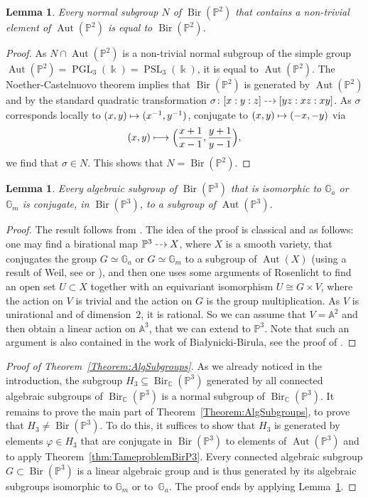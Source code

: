 \documentclass[JEP,XML,SOM,Unicode,NoFloatCountersInSection]{cedram}
\newcommand\mto{\mathchoice{\longmapsto}{\mapsto}{\mapsto}{\mapsto}}
\newcommand{\dradpl}{{\hspace*{-2mm}\begin{tikzcd}[ampersand replacement=\&,column sep = scriptsize]\mbox{}\ar[r,dashed]\&\mbox{}\end{tikzcd}\hspace*{-2mm}}}
\newcommand{\dratst}{{\hspace*{-2mm}\begin{tikzcd}[ampersand replacement=\&,column sep = small]\mbox{}\ar[r,dashed]\&\mbox{}\end{tikzcd}\hspace*{-2mm}}}
\let\drascst\dratst
\newcommand{\dra}{\mathchoice{\dradpl}{\dratst}{\drascst}{\drascst}}
\DeclareMathOperator{\Bir}{Bir}
\DeclareMathOperator{\Aut}{Aut}
\DeclareMathOperator{\PGL}{PGL}
\DeclareMathOperator{\PSL}{PSL}
\theoremstyle{plain}
\newtheorem{lem}[thm]{Lemma}
\theoremstyle{definition}
\newcommand{\CC}{\mathbb C}
\newcommand{\kk}{\Bbbk}
\newcommand{\PP}{\mathbb P}
\begin{document}
\begin{lem}\label{Lem:NormalSubAutP2}
Every normal subgroup $N$ of $\Bir(\PP^2)$ that contains a non-trivial element of $\Aut(\PP^2)$ is equal to $\Bir(\PP^2)$.
\end{lem}

\begin{proof}
As $N\cap \Aut(\PP^2)$ is a non-trivial normal subgroup of the simple group $\Aut(\PP^2)=\PGL_3(\kk)=\PSL_3(\kk)$, it is equal to $\Aut(\PP^2)$.
The Noether-Castelnuovo theorem \cite{Cas} implies that $\Bir(\PP^2)$ is generated by $\Aut(\PP^2)$ and by the standard quadratic transformation $\sigma\colon [x:y:z]\dra [yz:xz:xy]$. As $\sigma$ corresponds locally to $(x,y)\mto (x^{-1},y^{-1})$, conjugate to $(x,y)\mto (-x,-y)$ via
\[
(x,y)\mto \Bigl(\frac{x+1}{x-1},\frac{y+1}{y-1}\Bigr),
\] we find that $\sigma\in N$. This shows that $N=\Bir(\PP^2)$.
\end{proof}
\begin{lem}\label{Lem:GaGmAutP3}
Every algebraic subgroup of $\Bir(\PP^3)$ that is isomorphic to $\mathbb{G}_a$ or $\mathbb{G}_m$ is conjugate, in $\Bir(\PP^3)$, to a subgroup of $\Aut(\PP^3)$.
\end{lem}
\begin{proof}The result follows from \cite[2.5.8]{BFT}.
The idea of the proof is classical and as follows: one may find a birational map $\PP^3\dra X$, where $X$ is a smooth variety, that conjugates the group $G\simeq \mathbb{G}_a$ or $G\simeq \mathbb{G}_m$ to a subgroup of $\Aut(X)$ (using a result of Weil, see \cite{Weil} or \cite{Kraft}), and then one uses some arguments of Rosenlicht to find an open set $U\subset X$ together with an equivariant isomorphism $U\cong G\times V$, where the action on $V$ is trivial and the action on $G$ is the group multiplication. As $V$ is unirational and of dimension~$2$, it is rational. So we can assume that $V=\mathbb{A}^2$ and then obtain a linear action on $\mathbb{A}^3$, that we can extend to $\PP^3$. Note that such an argument is also contained in the work of Bia\l{}ynicki-Birula, see the proof of \cite[Th.\,2]{Bia73}.
\end{proof}

\begin{proof}[Proof of Theorem~\ref{Theorem:AlgSubgroups}]
As we already noticed in the introduction, the subgroup $H_3\subseteq\Bir_{\CC}(\PP^3)$ generated by all connected algebraic subgroups of $\Bir_\CC(\PP^3)$ is a normal subgroup of $\Bir_{\CC}(\PP^3)$. It remains to prove the main part of Theorem~\ref{Theorem:AlgSubgroups}, \ie to prove that $H_3\not=\Bir(\PP^3)$. To do this, it suffices to show that $H_3$ is generated by elements $\varphi\in H_3$ that are conjugate in $\Bir(\PP^3)$ to elements of $\Aut(\PP^3)$ and to apply Theorem~\ref{thm:TameproblemBirP3}. Every connected algebraic subgroup $G\subset \Bir(\PP^3)$ is a linear algebraic group \cite[Rem.\,2.21]{BF13} and is thus generated by its algebraic subgroups isomorphic to $\mathbb{G}_m$ or to~$\mathbb{G}_a$. The proof ends by applying Lemma~\ref{Lem:GaGmAutP3}.
\end{proof}

\vspace*{\baselineskip}
\backmatter


\end{document}
